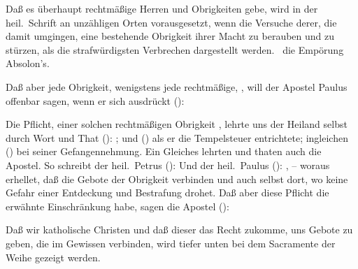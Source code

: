 \begin{aufza}
\item Daß es überhaupt rechtmäßige Herren und Obrigkeiten gebe, wird in der heil.\ Schrift an unzähligen Orten vorausgesetzt, wenn die Versuche derer, die damit umgingen, eine bestehende Obrigkeit ihrer Macht zu berauben und zu stürzen, als die strafwürdigsten Verbrechen dargestellt werden. \ZB\  die Empörung Absolon's.
\item Daß aber jede Obrigkeit, wenigstens jede rechtmäßige, , will der Apostel Paulus offenbar sagen, wenn er sich ausdrückt (): 
\item Die Pflicht, einer solchen rechtmäßigen Obrigkeit , lehrte uns der Heiland selbst durch Wort und That (): ; und () als er die Tempelsteuer entrichtete; ingleichen () bei seiner Gefangennehmung. Ein Gleiches lehrten und thaten auch die Apostel. So schreibt der heil.\ Petrus ():  Und der heil.\ Paulus (): , -- woraus erhellet, daß die Gebote der Obrigkeit  verbinden und auch selbst dort, wo keine Gefahr einer Entdeckung und Bestrafung drohet. Daß aber diese Pflicht die erwähnte Einschränkung habe, sagen die Apostel (): 
\item Daß wir katholische Christen  und daß dieser das Recht zukomme, uns Gebote zu geben, die im Gewissen verbinden, wird tiefer unten bei dem Sacramente der Weihe gezeigt werden.

\end{aufza}
